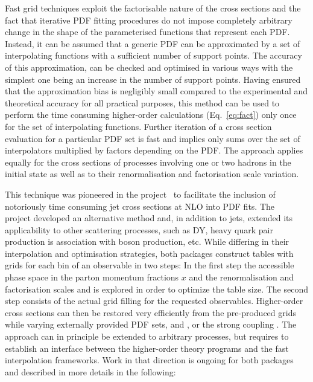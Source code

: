   Fast grid techniques exploit the factorisable nature of the cross sections and 
  the fact that iterative PDF fitting
  procedures do not impose completely arbitrary change in the shape
  of the parameterised functions that represent each PDF\@.
  Instead, it can be assumed that a generic PDF can be approximated by
  a set of interpolating functions with a sufficient number of
support points. The 
  accuracy of this approximation, can be checked and optimised 
  in various ways with the simplest one being an increase in the number of
  support points. Having ensured that the approximation bias
  is negligibly
  small compared to the experimental and theoretical accuracy 
  for all practical purposes, this method can be used to perform
  the time consuming higher-order calculations (Eq.~\ref{eq:fact})
  only once for the set of interpolating functions. 
  Further iteration of a cross section evaluation for
  a particular PDF set is fast and implies only sums over
  the set of interpolators multiplied by factors depending on the
  PDF\@. The approach applies equally 
  for the cross sections of
  processes involving one or two hadrons in the initial state as well
  as to their renormalisation and factorisation scale variation.

  This technique was pioneered in the \fastnlo
  project~\cite{Kluge:2006xs} to facilitate the inclusion of
  notoriously time consuming jet cross sections at NLO into PDF fits.
  The \applgrid~\cite{Carli:2010rw} project developed an alternative method
  and, in addition to jets, extended its applicability to other scattering processes, 
  such as DY, heavy quark pair production is association with boson production, etc.
  While differing in their interpolation
  and optimisation strategies, both packages construct tables with
  grids for each bin of an observable in two steps: In the first step
  the accessible phase space in the parton momentum fractions $x$ and
  the renormalisation and factorisation scales \mur and \muf is
  explored in order to optimize the table size. The second step
  consists of the actual grid filling for the
  requested observables. Higher-order cross sections can then be
  restored very efficiently from the pre-produced grids while varying
  externally provided PDF sets, \mur and \muf, or the strong coupling
  \asq\@. The approach can in principle be extended to arbitrary
  processes, but requires to establish an interface between the
  higher-order theory programs and the fast interpolation
  frameworks. Work in that direction is ongoing for both packages
  and described in more details in the following:

